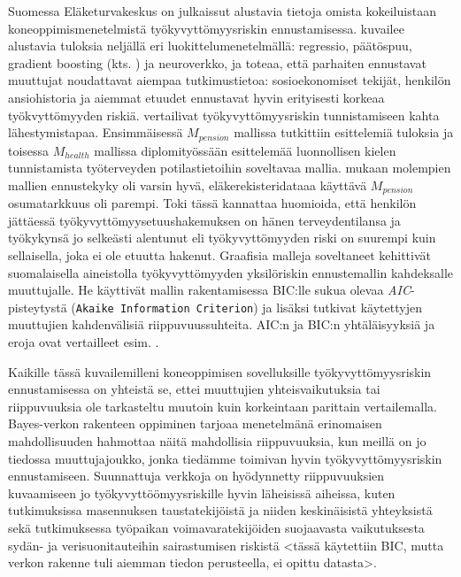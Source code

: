  Suomessa Eläketurvakeskus on julkaissut alustavia tietoja omista kokeiluistaan koneoppimismenetelmistä työkyvyttömyysriskin ennustamisessa. \citet{varis_aketurvakeskuksen_2018} kuvailee alustavia tuloksia neljällä eri luokittelumenetelmällä: regressio, päätöspuu, gradient boosting (kts. \citet{friedman_greedy_2001})  ja neuroverkko, ja toteaa, että parhaiten ennustavat muuttujat noudattavat aiempaa tutkimustietoa: sosioekonomiset tekijät, henkilön ansiohistoria ja aiemmat etuudet ennustavat hyvin erityisesti korkeaa työkvyttömyyden riskiä.  \citet{saarela_work_2022} vertailivat työkyvyttömyysriskin tunnistamiseen kahta lähestymistapaa. Ensimmäisessä $M_{pension}$ mallissa tutkittiin \citet{varis_aketurvakeskuksen_2018} esittelemiä tuloksia ja toisessa $M_{health}$ mallissa \citet{huhta-koivisto_work_2020} diplomityössään esittelemää luonnollisen kielen tunnistamista työterveyden potilastietoihin soveltavaa mallia. \citet{saarela_work_2022} mukaan molempien mallien ennustekyky oli varsin hyvä, eläkerekisteridataaa käyttävä $M_{pension}$ osumatarkkuus oli parempi. Toki tässä kannattaa huomioida, että henkilön jättäessä työkyvyttömyysetuushakemuksen on hänen terveydentilansa ja työkykynsä jo selkeästi alentunut eli työkyvyttömyyden riski on suurempi kuin sellaisella, joka ei ole etuutta hakenut. Graafisia malleja soveltaneet \citet{airaksinen_development_2017} kehittivät suomalaisella aineistolla työkyvyttömyyden yksilöriskin ennustemallin kahdeksalle muuttujalle. He käyttivät mallin rakentamisessa BIC:lle sukua olevaa \emph{AIC}-pisteytystä (\texttt{Akaike Information Criterion}) ja lisäksi tutkivat käytettyjen muuttujien kahdenvälisiä riippuvuussuhteita. AIC:n ja BIC:n yhtäläisyyksiä ja eroja ovat vertailleet esim. \citet{ding_model_2018}.

Kaikille tässä kuvailemilleni koneoppimisen sovelluksille työkyvyttömyysriskin ennustamisessa on yhteistä se, ettei muuttujien yhteisvaikutuksia tai riippuvuuksia ole tarkasteltu muutoin kuin korkeintaan parittain vertailemalla. Bayes-verkon rakenteen oppiminen tarjoaa menetelmänä erinomaisen mahdollisuuden hahmottaa näitä mahdollisia riippuvuuksia, kun meillä on jo tiedossa muuttujajoukko, jonka tiedämme toimivan hyvin työkyvyttömyysriskin ennustamiseen. Suunnattuja verkkoja on hyödynnetty riippuvuuksien kuvaamiseen jo työkyvyttöömyysriskille hyvin läheisissä aiheissa, kuten \citet{elovainio_is_2021, elovainio_network_2020} tutkimuksissa masennuksen taustatekijöistä ja niiden keskinäisistä yhteyksistä sekä \citet{xu_workplace_2022} tutkimuksessa työpaikan voimavaratekijöiden suojaavasta vaikutuksesta sydän- ja verisuonitauteihin sairastumisen riskistä <tässä käytettiin BIC, mutta verkon rakenne tuli aiemman tiedon perusteella, ei opittu datasta>. 

